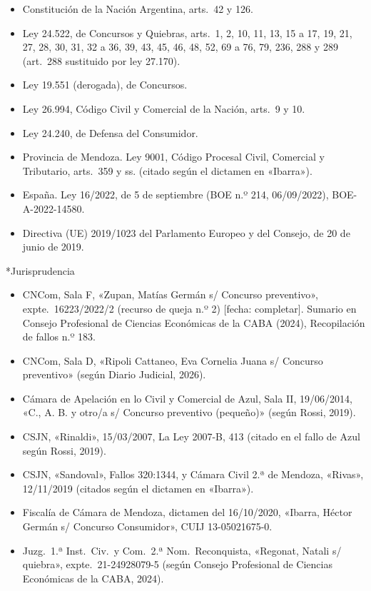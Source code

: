 \documentclass[12pt,oneside]{book}
\makeatletter
\renewcommand\section{\@startsection{section}{1}{\z@}{-3.5ex \@plus -1ex \@minus -.2ex}{2.3ex \@plus.2ex}{\normalfont\Large\bfseries\raggedright}}
\makeatother
\begin{document}
\begin{itemize}[leftmargin=*]
  \item Constitución de la Nación Argentina, arts.~42 y 126.
  \item Ley 24.522, de Concursos y Quiebras, arts.~1, 2, 10, 11, 13, 15 a 17, 19, 21, 27, 28, 30, 31, 32 a 36, 39, 43, 45, 46, 48, 52, 69 a 76, 79, 236, 288 y 289 (art.~288 sustituido por ley 27.170).
  \item Ley 19.551 (derogada), de Concursos.
  \item Ley 26.994, Código Civil y Comercial de la Nación, arts.~9 y 10.
  \item Ley 24.240, de Defensa del Consumidor.
  \item Provincia de Mendoza. Ley 9001, Código Procesal Civil, Comercial y Tributario, arts.~359 y ss. (citado según el dictamen en «Ibarra»).
  \item España. Ley 16/2022, de 5 de septiembre (BOE n.º 214, 06/09/2022), BOE-A-2022-14580.
  \item Directiva (UE) 2019/1023 del Parlamento Europeo y del Consejo, de 20 de junio de 2019.
\end{itemize}

\section*{Jurisprudencia}

\begin{itemize}[leftmargin=*]
  \item CNCom, Sala F, «Zupan, Matías Germán s/ Concurso preventivo», expte.\ 16223/2022/2 (recurso de queja n.º 2) [fecha: completar]. Sumario en Consejo Profesional de Ciencias Económicas de la CABA (2024), Recopilación de fallos n.º 183.
  \item CNCom, Sala D, «Ripoli Cattaneo, Eva Cornelia Juana s/ Concurso preventivo» (según Diario Judicial, 2026).
  \item Cámara de Apelación en lo Civil y Comercial de Azul, Sala II, 19/06/2014, «C., A. B. y otro/a s/ Concurso preventivo (pequeño)» (según Rossi, 2019).
  \item CSJN, «Rinaldi», 15/03/2007, La Ley 2007-B, 413 (citado en el fallo de Azul según Rossi, 2019).
  \item CSJN, «Sandoval», Fallos 320:1344, y Cámara Civil 2.ª de Mendoza, «Rivas», 12/11/2019 (citados según el dictamen en «Ibarra»).
  \item Fiscalía de Cámara de Mendoza, dictamen del 16/10/2020, «Ibarra, Héctor Germán s/ Concurso Consumidor», CUIJ 13-05021675-0.
  \item Juzg.\ 1.ª Inst.\ Civ.\ y Com.\ 2.ª Nom.\ Reconquista, «Regonat, Natali s/ quiebra», expte.\ 21-24928079-5 (según Consejo Profesional de Ciencias Económicas de la CABA, 2024).
\end{itemize}
\end{document}
